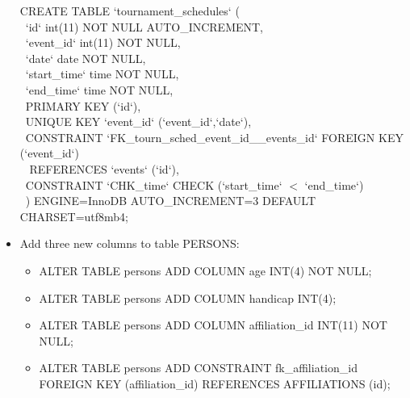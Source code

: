 \documentclass[titlepage]{article}
\begin{document}
\begin{itemize}
\hspace{15pt}CREATE TABLE `tournament\_schedules` ( \\
\-\ \hspace{30pt}`id` int(11) NOT NULL AUTO\_INCREMENT, \\
\-\ \hspace{30pt}`event\_id` int(11) NOT NULL, \\
\-\ \hspace{30pt}`date` date NOT NULL, \\
\-\ \hspace{30pt}`start\_time` time NOT NULL, \\
\-\ \hspace{30pt}`end\_time` time NOT NULL, \\
\-\ \hspace{30pt}PRIMARY KEY (`id`), \\
\-\ \hspace{30pt}UNIQUE KEY `event\_id` (`event\_id`,`date`), \\
\-\ \hspace{30pt}CONSTRAINT `FK\_tourn\_sched\_event\_id\_\_events\_id` FOREIGN KEY (`event\_id`) \\ \-\ \hspace{30pt} REFERENCES `events` (`id`), \\
\-\ \hspace{30pt}CONSTRAINT `CHK\_time` CHECK (`start\_time` $<$ `end\_time`) \\
\-\ \hspace{15pt}) ENGINE=InnoDB AUTO\_INCREMENT=3 DEFAULT CHARSET=utf8mb4;

\vspace{1em}

\item Add three new columns to table PERSONS: \vspace{1em}


\begin{itemize}
  \item ALTER TABLE persons ADD COLUMN age INT(4) NOT NULL;
  \item ALTER TABLE persons ADD COLUMN handicap INT(4);
  \item ALTER TABLE persons ADD COLUMN affiliation\_id INT(11) NOT NULL;
  \item ALTER TABLE persons ADD CONSTRAINT fk\_affiliation\_id \\ FOREIGN KEY (affiliation\_id) REFERENCES AFFILIATIONS (id);
\end{itemize}


\end{itemize}
\end{document}
